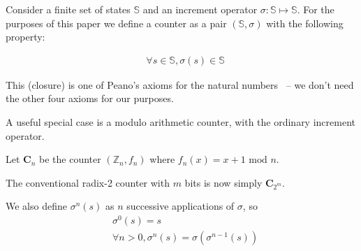 \documentclass[5p, twocolumn]{elsarticle}
\begin{document}
\newtheorem{theorem}{Theorem}[section]
\newtheorem{lemma}[theorem]{Lemma}
\newtheorem{proposition}[theorem]{Proposition}
\newtheorem{corollary}[theorem]{Corollary}

\newenvironment{proof}[1][Proof]{\begin{trivlist}
\item[\hskip \labelsep {\bfseries #1}]}{\end{trivlist}}
\newenvironment{definition}[1][Definition]{\begin{trivlist}
\item[\hskip \labelsep {\bfseries #1}]}{\end{trivlist}}
\newenvironment{example}[1][Example]{\begin{trivlist}
\item[\hskip \labelsep {\bfseries #1}]}{\end{trivlist}}
\newenvironment{remark}[1][Remark]{\begin{trivlist}
\item[\hskip \labelsep {\bfseries #1}]}{\end{trivlist}}

\begin{definition}
Consider a finite set of states $\mathbb{S}$ and an increment operator $\sigma:\mathbb{S}\mapsto \mathbb{S}$. For the purposes of this paper we define a counter as a pair $(\mathbb{S},\sigma)$ with the following property:

\begin{align}
& \forall s \in \mathbb{S}, \sigma(s) \in \mathbb{S}
\label{completeness_axiom}
\end{align}
\end{definition}

This (closure) is one of Peano's axioms for the natural numbers~\cite{peano} -- we don't need the other four axioms for our purposes.

A useful special case is a modulo arithmetic counter, with the ordinary increment operator.

\begin{definition}
Let $\mathbf{C}_n$ be the counter $(\mathbb{Z}_n,f_n)$ where $f_n(x)=x+1 \text{ mod } n$.
\end{definition}

The conventional radix-2 counter with $m$ bits is now simply $\mathbf{C}_{2^m}$.

\begin{definition}
We also define $\sigma^n(s)$ as $n$ successive applications of $\sigma$, so
\begin{align}
& \sigma^0(s)=s \\
& \forall n>0, \sigma^n(s)=\sigma(\sigma^{n-1}(s))
\end{align}
\end{definition}
\end{document}
